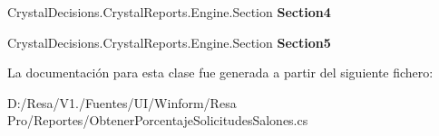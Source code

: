 \begin{DoxyCompactItemize}
\item 
Crystal\+Decisions.\+Crystal\+Reports.\+Engine.\+Section {\bfseries Section4}\hspace{0.3cm}{\ttfamily  [get]}\label{class_resa___pro_1_1_reportes_1_1_obtener_porcentaje_solicitudes_salones_a60fb4aa251708775bd44a3d0cda790d6}

\item 
Crystal\+Decisions.\+Crystal\+Reports.\+Engine.\+Section {\bfseries Section5}\hspace{0.3cm}{\ttfamily  [get]}\label{class_resa___pro_1_1_reportes_1_1_obtener_porcentaje_solicitudes_salones_af0c65e7e8273a059acc1364485e21951}

\end{DoxyCompactItemize}


La documentación para esta clase fue generada a partir del siguiente fichero\+:\begin{DoxyCompactItemize}
\item 
D\+:/\+Resa/\+V1./\+Fuentes/\+U\+I/\+Winform/\+Resa Pro/\+Reportes/Obtener\+Porcentaje\+Solicitudes\+Salones.\+cs\end{DoxyCompactItemize}
